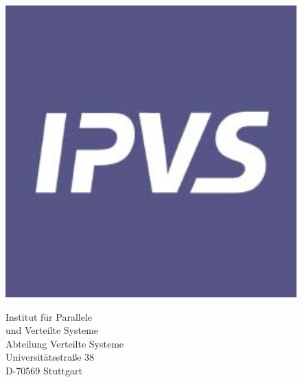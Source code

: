 \begin{titlepage}
\begin{figure}[h]
\centering
\begin{minipage}{0.2\textwidth}
\includegraphics[width=1.0\textwidth]{images/ipvs_logo.jpg}
\end{minipage}
\begin{minipage}{0.4\textwidth}
\begin{center}
Institut f\"ur Parallele\\
und Verteilte Systeme\\
Abteilung Verteilte Systeme\\
Universit\"atsstra{\ss}e 38\\
D-70569 Stuttgart
\end{center}
\end{minipage}
\begin{minipage}{0.2\textwidth}

\end{minipage}
\end{figure}
\end{titlepage}
